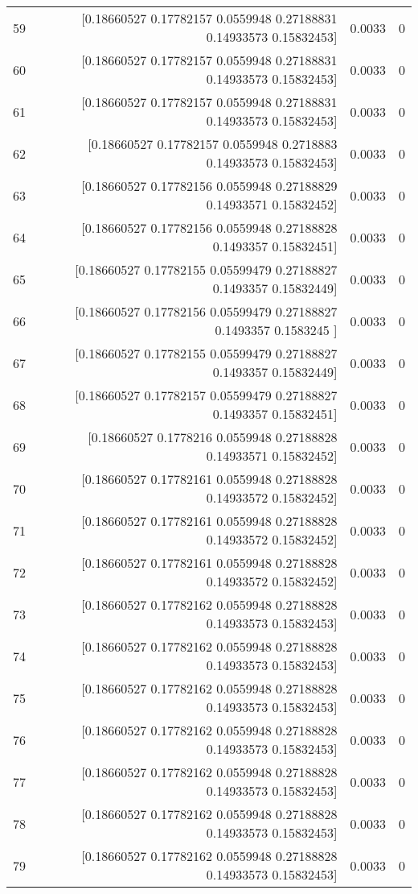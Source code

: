\begin{longtable}{lrrr}
59 & [0.18660527 0.17782157 0.0559948  0.27188831 0.14933573 0.15832453] & 0.0033 & 0 \\
60 & [0.18660527 0.17782157 0.0559948  0.27188831 0.14933573 0.15832453] & 0.0033 & 0 \\
61 & [0.18660527 0.17782157 0.0559948  0.27188831 0.14933573 0.15832453] & 0.0033 & 0 \\
62 & [0.18660527 0.17782157 0.0559948  0.2718883  0.14933573 0.15832453] & 0.0033 & 0 \\
63 & [0.18660527 0.17782156 0.0559948  0.27188829 0.14933571 0.15832452] & 0.0033 & 0 \\
64 & [0.18660527 0.17782156 0.0559948  0.27188828 0.1493357  0.15832451] & 0.0033 & 0 \\
65 & [0.18660527 0.17782155 0.05599479 0.27188827 0.1493357  0.15832449] & 0.0033 & 0 \\
66 & [0.18660527 0.17782156 0.05599479 0.27188827 0.1493357  0.1583245 ] & 0.0033 & 0 \\
67 & [0.18660527 0.17782155 0.05599479 0.27188827 0.1493357  0.15832449] & 0.0033 & 0 \\
68 & [0.18660527 0.17782157 0.05599479 0.27188827 0.1493357  0.15832451] & 0.0033 & 0 \\
69 & [0.18660527 0.1778216  0.0559948  0.27188828 0.14933571 0.15832452] & 0.0033 & 0 \\
70 & [0.18660527 0.17782161 0.0559948  0.27188828 0.14933572 0.15832452] & 0.0033 & 0 \\
71 & [0.18660527 0.17782161 0.0559948  0.27188828 0.14933572 0.15832452] & 0.0033 & 0 \\
72 & [0.18660527 0.17782161 0.0559948  0.27188828 0.14933572 0.15832452] & 0.0033 & 0 \\
73 & [0.18660527 0.17782162 0.0559948  0.27188828 0.14933573 0.15832453] & 0.0033 & 0 \\
74 & [0.18660527 0.17782162 0.0559948  0.27188828 0.14933573 0.15832453] & 0.0033 & 0 \\
75 & [0.18660527 0.17782162 0.0559948  0.27188828 0.14933573 0.15832453] & 0.0033 & 0 \\
76 & [0.18660527 0.17782162 0.0559948  0.27188828 0.14933573 0.15832453] & 0.0033 & 0 \\
77 & [0.18660527 0.17782162 0.0559948  0.27188828 0.14933573 0.15832453] & 0.0033 & 0 \\
78 & [0.18660527 0.17782162 0.0559948  0.27188828 0.14933573 0.15832453] & 0.0033 & 0 \\
79 & [0.18660527 0.17782162 0.0559948  0.27188828 0.14933573 0.15832453] & 0.0033 & 0 \\

\end{longtable}
